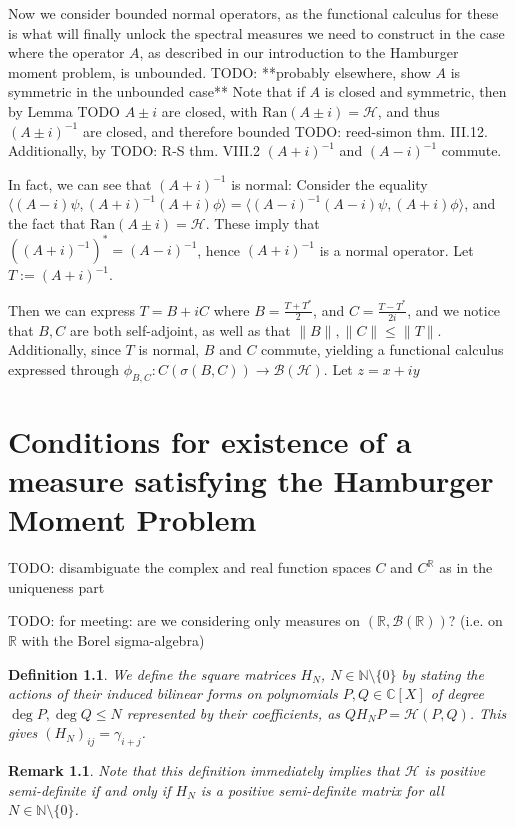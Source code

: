 \documentclass[12pt,oneside]{report}
\newtheorem{defn}[thm]{Definition}
\newtheorem{rem}[thm]{Remark}
\begin{document}
Now we consider bounded normal operators, as the functional calculus for these is what will finally unlock the spectral measures we need to construct in the case where the operator $A$, as described in our introduction to the Hamburger moment problem, is unbounded. TODO: **probably elsewhere, show $A$ is symmetric in the unbounded case** Note that if $A$ is closed and symmetric, then by Lemma TODO $A \pm i$ are closed, with $\text{Ran}(A \pm i) = \mathscr{H}$, and thus $(A \pm i)^{-1}$ are closed, and therefore bounded TODO: reed-simon thm. III.12. Additionally, by TODO: R-S thm. VIII.2 $(A+i)^{-1}$ and $(A-i)^{-1}$ commute.

In fact, we can see that $(A+i)^{-1}$ is normal: Consider the equality $\langle (A - i)\psi, (A+i)^{-1}(A+i)\phi \rangle = \langle (A-i)^{-1}(A-i)\psi, (A+i)\phi \rangle$, and the fact that $\text{Ran}(A \pm i) = \mathscr{H}$. These imply that $((A+i)^{-1})^{*} = (A-i)^{-1}$, hence $(A+i)^{-1}$ is a normal operator. Let $T := (A+i)^{-1}$.

Then we can express $T = B + iC$ where $B = \frac{T + T^{*}}{2}$, and $C = \frac{T - T^{*}}{2i}$, and we notice that $B,C$ are both self-adjoint, as well as that $\|B\|, \|C\| \leq \|T\|$. Additionally, since $T$ is normal, $B$ and $C$ commute, yielding a functional calculus expressed through $\phi_{B,C}: C(\sigma(B,C)) \to \mathscr{B}(\mathscr{H})$. Let $z = x + iy$

\chapter{Conditions for existence of a measure satisfying the Hamburger Moment Problem}

TODO: disambiguate the complex and real function spaces $C$ and $C^{\mathbb{R}}$ as in the uniqueness part

TODO: for meeting: are we considering only measures on $(\mathbb{R}, \mathcal{B}(\mathbb{R}))$? (i.e. on $\mathbb{R}$ with the Borel sigma-algebra)

\begin{defn}
    We define the square matrices $H_{N}$, $N \in \mathbb{N} \setminus \{ 0 \}$ by stating the actions of their induced bilinear forms on polynomials $P, Q \in \mathbb{C}[X]$ of degree $\deg P, \deg Q \leq N$ represented by their coefficients, as $QH_{N}P = \mathcal{H}(P,Q)$. This gives $(H_{N})_{ij} = \gamma_{i+j}$.
\end{defn}

\begin{rem}
    Note that this definition immediately implies that $\mathcal{H}$ is positive semi-definite if and only if $H_{N}$ is a positive semi-definite matrix for all $N \in \mathbb{N} \setminus \{ 0 \}$.
\end{rem}
\end{document}
